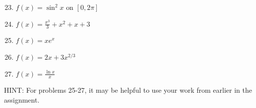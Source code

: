\documentclass[12pt]{article}
\newif\ifans
\begin{document}

\begin{enumerate}
\setcounter{enumi}{22}

\item $f(x) = \sin^{2}{x} \text{ on } [0,2\pi]$ 

\ifans{\fbox{\parbox{0.55\linewidth}{
Relative minima at $(0,0)$, $(\pi,0)$, and $(2\pi,0)$;\\
Relative maxima at $\left(\frac{\pi}{2},1,\right)$ and $\left(\frac{3\pi}{2},1\right)$}}} \fi

\item $f(x)=\frac{x^3}{3}+x^2+x+3$

\ifans{\fbox{No relative extrema}} \fi

\item $f(x) = xe^x$  

\ifans{\fbox{Relative minimum at $\left(-1,-\frac{1}{e}\right)$}} \fi

\item $f(x)=2x+3x^{2/3}$

\item $f(x)=\frac{\ln{x}}{x}$

\end{enumerate}

\noindent HINT: For problems 25-27, it may be helpful to use your work from earlier in the assignment.
\end{document}
